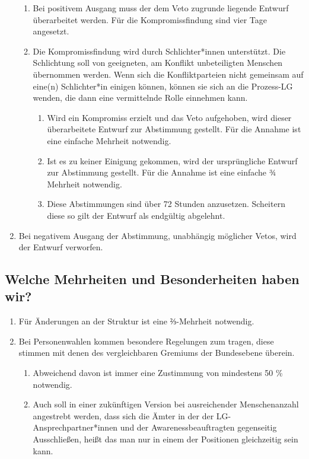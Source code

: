 \documentclass[a4paper,
  ]{scrartcl}
\begin{document}
\begin{enumerate}
\begin{enumerate}
                  \item Bei positivem Ausgang muss der dem Veto zugrunde liegende Entwurf überarbeitet
                        werden. Für die Kompromissfindung sind vier Tage angesetzt.
                  \item Die Kompromissfindung wird durch Schlichter*innen unterstützt. Die Schlichtung soll von
                        geeigneten, am Konflikt unbeteiligten Menschen übernommen werden. Wenn sich die
                        Konfliktparteien nicht gemeinsam auf eine(n) Schlichter*in einigen können, können sie
                        sich an die Prozess-LG wenden, die dann eine vermittelnde Rolle
                        einnehmen kann.
                        \begin{enumerate}
                              \item Wird ein Kompromiss erzielt und das Veto aufgehoben, wird dieser überarbeitete
                                    Entwurf zur Abstimmung gestellt. Für die Annahme ist eine einfache Mehrheit
                                    notwendig.
                              \item Ist es zu keiner Einigung gekommen, wird der ursprüngliche Entwurf zur
                                    Abstimmung gestellt. Für die Annahme ist eine einfache 3⁄4 Mehrheit notwendig.
                              \item Diese Abstimmungen sind über 72 Stunden anzusetzen. Scheitern diese so gilt
                                    der Entwurf als endgültig abgelehnt.
                        \end{enumerate}
            \end{enumerate}
      \item Bei negativem Ausgang der Abstimmung, unabhängig möglicher Vetos, wird der Entwurf
            verworfen.
\end{enumerate}
\subsection{Welche Mehrheiten und Besonderheiten haben wir?}
\begin{enumerate}
      \item Für Änderungen an der Struktur ist eine ⅔-Mehrheit notwendig.
      \item Bei Personenwahlen kommen besondere Regelungen zum tragen, diese stimmen mit denen des
            vergleichbaren Gremiums der Bundesebene überein.
            \begin{enumerate}
                  \item Abweichend davon ist immer eine Zustimmung von mindestens 50 \% notwendig.
                  \item Auch soll in einer zukünftigen Version bei ausreichender Menschenanzahl angestrebt
                        werden, dass sich die Ämter in der der LG-Ansprechpartner*innen und der
                        Awarenessbeauftragten gegenseitig Ausschließen, heißt das man nur in einem der
                        Positionen gleichzeitig sein kann.
            \end{enumerate}
\end{enumerate}
\end{document}
